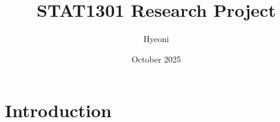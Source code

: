 \documentclass{article}
\title{STAT1301 Research Project}
\author{Hyeoni }
\date{October 2025}
\begin{document}
\maketitle

\section{Introduction}
\end{document}
